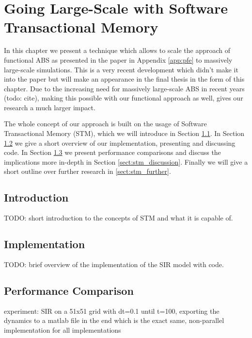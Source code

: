 \chapter{Going Large-Scale with Software Transactional Memory}
\label{chap:stm}

In this chapter we present a technique which allows to scale the approach of functional ABS as presented in the paper in Appendix \ref{app:pfe} to massively large-scale simulations. This is a very recent development which didn't make it into the paper but will make an appearance in the final thesis in the form of this chapter. Due to the increasing need for massively large-scale ABS in recent years (todo: cite), making this possible with our functional approach as well, gives our research a much larger impact.

The whole concept of our approach is built on the usage of Software Transactional Memory (STM), which we will introduce in Section \ref{sect:stm_intro}. In Section \ref{sect:stm_impl} we give a short overview of our implementation, presenting and discussing code. In Section \ref{sect:stm_perf} we present performance comparisons and discuss the implications more in-depth in Section \ref{sect:stm_discussion}. Finally we will give a short outline over further research in \ref{sect:stm_further}.

\section{Introduction}
\label{sect:stm_intro}
TODO: short introduction to the concepts of STM and what it is capable of.

\section{Implementation}
\label{sect:stm_impl}
TODO: brief overview of the implementation of the SIR model with code.

\section{Performance Comparison}
\label{sect:stm_perf}
experiment: SIR on a 51x51 grid with dt=0.1 until t=100, exporting the dynamics to a matlab file in the end which is the exact same, non-parallel implementation for all implementations 


